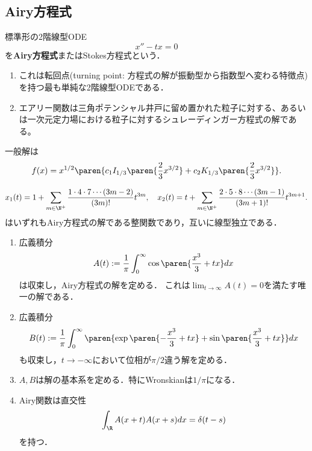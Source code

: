 \documentclass[uplatex,dvipdfmx]{jsreport}
\begin{document}
\subsection{Airy方程式}

\begin{problem}
    標準形の2階線型ODE
    \[x''-tx=0\]
    を\textbf{Airy方程式}またはStokes方程式という．
    \begin{enumerate}
        \item これは転回点(turning point: 方程式の解が振動型から指数型へ変わる特徴点)を持つ最も単純な2階線型ODEである．
        \item エアリー関数は三角ポテンシャル井戸に留め置かれた粒子に対する、あるいは一次元定力場における粒子に対するシュレーディンガー方程式の解である。
    \end{enumerate}
\end{problem}

\begin{proposition}[Bessel方程式への帰着]
    一般解は
    \[f(x)=x^{1/2}\paren{c_1I_{1/3}\paren{\frac{2}{3}x^{3/2}}+c_2K_{1/3}\paren{\frac{2}{3}x^{3/2}}}.\]
\end{proposition}

\begin{proposition}[級数法による解]
    \[x_1(t)=1+\sum_{m\in\N^+}\frac{1\cdot 4\cdot 7\cdots(3m-2)}{(3m)!}t^{3m},\quad x_2(t)=t+\sum_{m\in\N^+}\frac{2\cdot 5\cdot 8\cdots (3m-1)}{(3m+1)!}t^{3m+1}.\]
    はいずれもAiry方程式の解である整関数であり，互いに線型独立である．
\end{proposition}

\begin{proposition}\mbox{}
    \begin{enumerate}
        \item 広義積分
        \[A(t):=\frac{1}{\pi}\int^\infty_0\cos\paren{\frac{x^3}{3}+tx}dx\]
        は収束し，Airy方程式の解を定める．
        これは$\lim_{t\to\infty}A(t)=0$を満たす唯一の解である．
        \item 広義積分
        \[B(t):=\frac{1}{\pi}\int^\infty_0\paren{\exp\paren{-\frac{x^3}{3}+tx}+\sin\paren{\frac{x^3}{3}+tx}}dx\]
        も収束し，$t\to-\infty$において位相が$\pi/2$違う解を定める．
        \item $A,B$は解の基本系を定める．特にWronskianは$1/\pi$になる．
        \item Airy関数は直交性
        \[\int_\R A(x+t)A(x+s)dx=\delta(t-s)\]
        を持つ．
    \end{enumerate}
\end{proposition}
\end{document}
